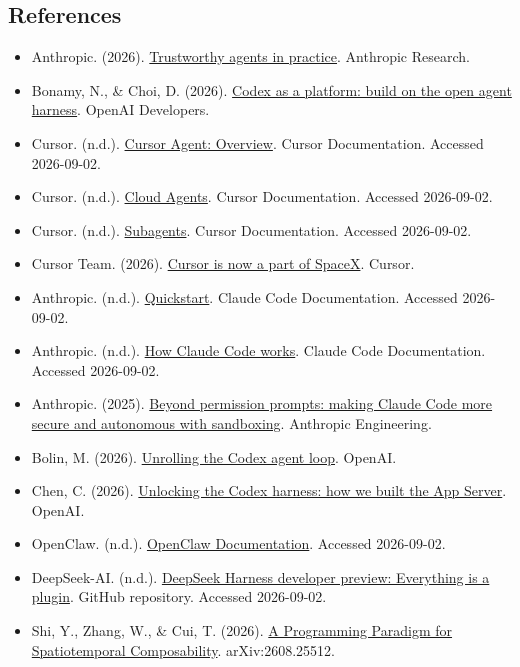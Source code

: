 \FloatBarrier
{}
\hypertarget{references-118}{%
\subsection{References}\label{references-118}}

\vspace{0.25em}
\begin{itemize}
\tightlist
\item
  Anthropic. (2026). \href{https://www.anthropic.com/research/trustworthy-agents}{Trustworthy agents in practice}. Anthropic Research.
\item
  Bonamy, N., \& Choi, D. (2026). \href{https://developers.openai.com/blog/codex-as-a-platform}{Codex as a platform: build on the open agent harness}. OpenAI Developers.
\item
  Cursor. (n.d.). \href{https://cursor.com/docs/agent/overview}{Cursor Agent: Overview}. Cursor Documentation. Accessed 2026-09-02.
\item
  Cursor. (n.d.). \href{https://cursor.com/docs/cloud-agent}{Cloud Agents}. Cursor Documentation. Accessed 2026-09-02.
\item
  Cursor. (n.d.). \href{https://cursor.com/docs/subagents}{Subagents}. Cursor Documentation. Accessed 2026-09-02.
\item
  Cursor Team. (2026). \href{https://cursor.com/blog/joining-spacex}{Cursor is now a part of SpaceX}. Cursor.
\item
  Anthropic. (n.d.). \href{https://code.claude.com/docs/en/quickstart}{Quickstart}. Claude Code Documentation. Accessed 2026-09-02.
\item
  Anthropic. (n.d.). \href{https://code.claude.com/docs/en/how-claude-code-works}{How Claude Code works}. Claude Code Documentation. Accessed 2026-09-02.
\item
  Anthropic. (2025). \href{https://www.anthropic.com/engineering/claude-code-sandboxing}{Beyond permission prompts: making Claude Code more secure and autonomous with sandboxing}. Anthropic Engineering.
\item
  Bolin, M. (2026). \href{https://openai.com/index/unrolling-the-codex-agent-loop/}{Unrolling the Codex agent loop}. OpenAI.
\item
  Chen, C. (2026). \href{https://openai.com/index/unlocking-the-codex-harness/}{Unlocking the Codex harness: how we built the App Server}. OpenAI.
\item
  OpenClaw. (n.d.). \href{https://docs.openclaw.ai/}{OpenClaw Documentation}. Accessed 2026-09-02.
\item
  DeepSeek-AI. (n.d.). \href{https://github.com/deepseek-ai/deepseek-harness}{DeepSeek Harness developer preview: Everything is a plugin}. GitHub repository. Accessed 2026-09-02.
\item
  Shi, Y., Zhang, W., \& Cui, T. (2026). \href{https://arxiv.org/abs/2608.25512}{A Programming Paradigm for Spatiotemporal Composability}. arXiv:2608.25512.
\end{itemize}

\clearpage
